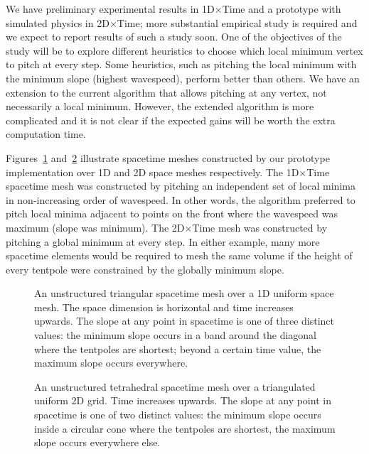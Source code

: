 \documentclass[twocolumn]{article}
\def\fig#1{fig/#1}
\newif\iffig
\begin{document}
We have preliminary experimental results in 1D$\times$Time and a
prototype with simulated physics in 2D$\times$Time; more substantial
empirical study is required and we expect to report results of such a
study soon.  One of the objectives of the study will be to explore
different heuristics to choose which local minimum vertex to pitch at
every step.  Some heuristics, such as pitching the local minimum with
the minimum slope (highest wavespeed), perform better than others.  We
have an extension to the current algorithm that allows pitching at any
vertex, not necessarily a local minimum.  However, the extended
algorithm is more complicated and it is not clear if the expected
gains will be worth the extra computation time.

Figures~\ref{fig:1d:example} and~\ref{fig:2d:example} illustrate
spacetime meshes constructed by our prototype implementation over 1D
and 2D space meshes respectively.  The 1D$\times$Time spacetime mesh
was constructed by pitching an independent set of local minima in
non-increasing order of wavespeed.  In other words, the algorithm
preferred to pitch local minima adjacent to points on the front where
the wavespeed was maximum (slope was minimum).  The 2D$\times$Time
mesh was constructed by pitching a global minimum at every step.  In
either example, many more spacetime elements would be required to mesh
the same volume if the height of every tentpole were constrained by
the globally minimum slope.

\begin{figure}\centering\sf
\iffig\texttt{[image: \\fig\{maxwavespeed-localminimum-parallel]}}\fi
\caption{An unstructured triangular spacetime mesh over a 1D uniform
space mesh.  The space dimension is horizontal and time increases
upwards.  The slope at any point in spacetime is one of three distinct
values: the minimum slope occurs in a band around the diagonal where
the tentpoles are shortest; beyond a certain time value, the maximum
slope occurs everywhere.}
\label{fig:1d:example}
\end{figure}

\begin{figure}\centering\sf
\iffig\texttt{[image: \\fig\{grid10x10]}}\fi
\caption{An unstructured tetrahedral spacetime mesh over a triangulated
  uniform 2D grid.
  Time increases upwards.
  The slope at any point in spacetime is one of two distinct
  values: the minimum slope occurs inside a circular cone where the
  tentpoles are shortest, the maximum slope occurs everywhere else.}
\label{fig:2d:example}
\end{figure}
\end{document}
